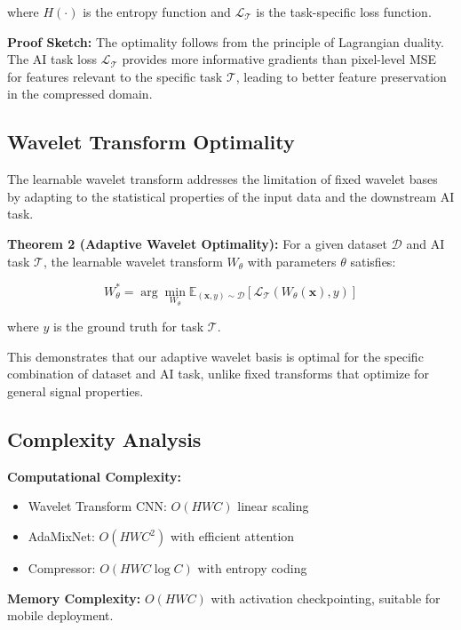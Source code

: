 \documentclass[conference]{IEEEtran}
\begin{document}
where $H(\cdot)$ is the entropy function and $\mathcal{L}_{\mathcal{T}}$ is the task-specific loss function.

\textbf{Proof Sketch:} The optimality follows from the principle of Lagrangian duality. The AI task loss $\mathcal{L}_{\mathcal{T}}$ provides more informative gradients than pixel-level MSE for features relevant to the specific task $\mathcal{T}$, leading to better feature preservation in the compressed domain.

\subsection{Wavelet Transform Optimality}

The learnable wavelet transform addresses the limitation of fixed wavelet bases by adapting to the statistical properties of the input data and the downstream AI task.

\textbf{Theorem 2 (Adaptive Wavelet Optimality):} For a given dataset $\mathcal{D}$ and AI task $\mathcal{T}$, the learnable wavelet transform $W_{\theta}$ with parameters $\theta$ satisfies:

\begin{equation}
W_{\theta}^* = \arg\min_{W_{\theta}} \mathbb{E}_{(\mathbf{x}, y) \sim \mathcal{D}}[\mathcal{L}_{\mathcal{T}}(W_{\theta}(\mathbf{x}), y)]
\end{equation}

where $y$ is the ground truth for task $\mathcal{T}$.

This demonstrates that our adaptive wavelet basis is optimal for the specific combination of dataset and AI task, unlike fixed transforms that optimize for general signal properties.

\subsection{Complexity Analysis}

\textbf{Computational Complexity:}
\begin{itemize}
\item Wavelet Transform CNN: $O(HWC)$ linear scaling
\item AdaMixNet: $O(HWC^2)$ with efficient attention
\item Compressor: $O(HWC \log C)$ with entropy coding
\end{itemize}

\textbf{Memory Complexity:} $O(HWC)$ with activation checkpointing, suitable for mobile deployment.
\end{document}
